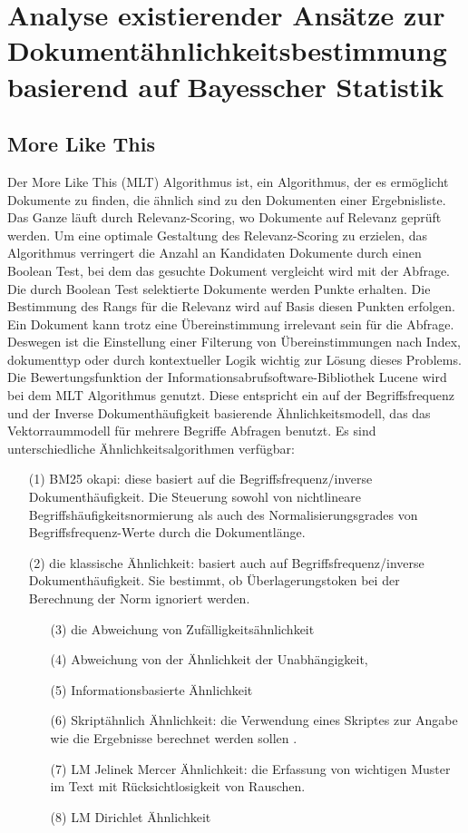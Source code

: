 \section{Analyse existierender Ansätze zur Dokumentähnlichkeitsbestimmung basierend auf Bayesscher Statistik}
\label{sec:AnalyseAnsätze}


\subsection{More Like This}
\label{subsec:MLT}

Der More Like This (MLT) Algorithmus ist, ein Algorithmus, der es ermöglicht Dokumente zu finden, die ähnlich sind zu den Dokumenten einer Ergebnisliste. Das Ganze läuft durch Relevanz-Scoring, wo Dokumente auf Relevanz geprüft werden. Um eine optimale Gestaltung des Relevanz-Scoring zu erzielen, das Algorithmus verringert die Anzahl an Kandidaten Dokumente durch einen Boolean Test, bei dem das gesuchte Dokument vergleicht wird mit der Abfrage. Die durch Boolean Test selektierte Dokumente werden Punkte erhalten. Die Bestimmung des Rangs für die Relevanz wird auf Basis diesen Punkten erfolgen. Ein Dokument kann trotz eine Übereinstimmung irrelevant sein für die Abfrage. Deswegen ist die Einstellung einer Filterung von Übereinstimmungen nach Index, dokumenttyp oder durch kontextueller Logik wichtig zur Lösung dieses Problems.
Die Bewertungsfunktion der Informationsabrufsoftware-Bibliothek Lucene wird bei dem MLT Algorithmus genutzt. Diese entspricht ein auf der Begriffsfrequenz und der Inverse Dokumenthäufigkeit basierende Ähnlichkeitsmodell, das das Vektorraummodell für mehrere Begriffe Abfragen benutzt. Es sind unterschiedliche Ähnlichkeitsalgorithmen verfügbar:
\begin{itemize}
	\item [(1)]BM25 okapi: diese basiert auf die Begriffsfrequenz/inverse Dokumenthäufigkeit. Die Steuerung sowohl von nichtlineare Begriffshäufigkeitsnormierung als auch des Normalisierungsgrades von Begriffsfrequenz-Werte durch die Dokumentlänge. 
\item[(2)] die klassische Ähnlichkeit: basiert auch auf Begriffsfrequenz/inverse Dokumenthäufigkeit. Sie bestimmt, ob Überlagerungstoken bei der Berechnung der Norm ignoriert werden\cite{ELA18}.
\begin{itemize}
	\item [(3)]	die Abweichung von Zufälligkeitsähnlichkeit
\item [(4)]	Abweichung von der Ähnlichkeit der Unabhängigkeit, 
\item [(5)]Informationsbasierte Ähnlichkeit
\item [(6)]	Skriptähnlich Ähnlichkeit: die Verwendung eines Skriptes zur Angabe wie die Ergebnisse berechnet werden sollen \cite{ELA18}.
\item [(7)]	LM Jelinek Mercer Ähnlichkeit: die Erfassung von wichtigen Muster im Text mit Rücksichtlosigkeit von Rauschen.
\item [(8)]	LM Dirichlet Ähnlichkeit
\end{itemize}
\end{itemize}
